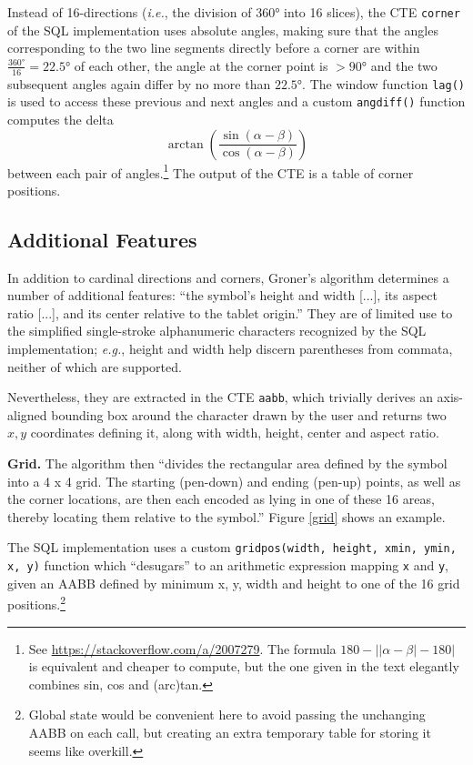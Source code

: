 \documentclass[sigconf]{acmart}
\begin{document}
Instead of 16-directions (\textit{i.e.}, the division of 360° into 16 slices), the CTE \texttt{corner} of the SQL implementation uses absolute angles, making sure that the angles corresponding to the two line segments directly before a corner are within $\frac{360°}{16} = 22.5°$ of each other, the angle at the corner point is $>90°$ and the two subsequent angles again differ by no more than $22.5°$. The window function \texttt{lag()} is used to access these previous and next angles and a custom \texttt{angdiff()} function computes the delta $$\arctan\left(\frac{\sin(\alpha-\beta)}{\cos(\alpha-\beta)}\right)$$ between each pair of angles.\footnote{See \url{https://stackoverflow.com/a/2007279}. The formula $180 - \left|\left|\alpha - \beta\right| - 180\right|$ is equivalent and cheaper to compute, but the one given in the text elegantly combines sin, cos and (arc)tan.} The output of the CTE is a table of corner positions.

\subsection{Additional Features}

In addition to cardinal directions and corners, Groner's algorithm determines a number of additional features: \enquote{the symbol's height and width [...], its aspect ratio [...], and its center relative to the tablet origin.} \cite{groner} They are of limited use to the simplified single-stroke alphanumeric characters recognized by the SQL implementation; \textit{e.g.}, height and width help discern parentheses from commata, neither of which are supported.

Nevertheless, they are extracted in the CTE \texttt{aabb}, which trivially derives an axis-aligned bounding box around the character drawn by the user and returns two $x,y$ coordinates defining it, along with width, height, center and aspect ratio.

\textbf{Grid.} The algorithm then \enquote{divides the rectangular area defined by the symbol into a 4 x 4 grid. The starting (pen-down) and ending (pen-up) points, as well as the corner locations, are then each encoded as lying in one of these 16 areas, thereby locating them relative to the symbol.} \cite{groner} Figure \ref{grid} shows an example.

The SQL implementation uses a custom \texttt{gridpos(width, height, xmin, ymin, x, y)} function which \enquote{desugars} to an arithmetic expression mapping \texttt{x} and \texttt{y}, given an AABB defined by minimum x, y, width and height to one of the 16 grid positions.\footnote{Global state would be convenient here to avoid passing the unchanging AABB on each call, but creating an extra temporary table for storing it seems like overkill.}
\end{document}
